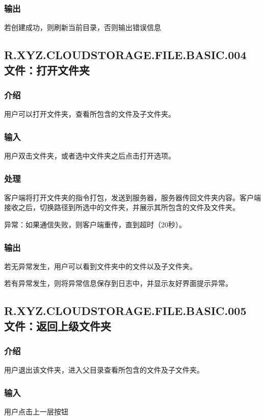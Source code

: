 \subsubsection{输出} 
若创建成功，则刷新当前目录，否则输出错误信息



\subsection{R.XYZ.CLOUDSTORAGE.FILE.BASIC.004 文件：打开文件夹}

\subsubsection{介绍}
用户可以打开文件夹，查看所包含的文件及子文件夹。

\subsubsection{输入}
用户双击文件夹，或者选中文件夹之后点击打开选项。

\subsubsection{处理}
客户端将打开文件夹的指令打包，发送到服务器，服务器传回文件夹内容。客户端接收之后，切换路径到所选中的文件夹，并展示其所包含的文件及文件夹。

异常：如果通信失败，则客户端重传，直到超时（20秒）。

\subsubsection{输出}
若无异常发生，用户可以看到文件夹中的文件以及子文件夹。

若有异常发生，则将异常信息保存到日志中，并显示友好界面提示异常。

\subsection{R.XYZ.CLOUDSTORAGE.FILE.BASIC.005 文件：返回上级文件夹}

\subsubsection{介绍}
用户退出该文件夹，进入父目录查看所包含的文件及子文件夹。

\subsubsection{输入}
用户点击上一层按钮

